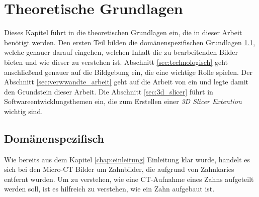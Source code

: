 \chapter{Theoretische Grundlagen}
\label{chap:theoretische_grundlagen} Dieses Kapitel führt in die theoretischen Grundlagen
ein, die in dieser Arbeit benötigt werden. Den ersten Teil bilden die domänenspezifischen
Grundlagen \ref{sec:domänenspezifisch}, welche genauer darauf eingehen, welchen Inhalt
die zu bearbeitenden Bilder bieten und wie dieser zu verstehen ist. Abschnitt
\ref{sec:technologisch} geht anschließend genauer auf die Bildgebung ein, die eine
wichtige Rolle spielen. Der Abschnitt \ref{sec:verwwandte_arbeit} geht auf die
Arbeit von \citet{hoffmann2020} ein und legte damit den Grundstein dieser Arbeit.
Die Abschnitt \ref{sec:3d_slicer} führt in Softwareentwicklungsthemen ein, die zum
Erstellen einer \textit{3D Slicer Extention} wichtig sind.

\section{Domänenspezifisch}
\label{sec:domänenspezifisch} Wie bereits aus dem Kapitel \ref{chap:einleitung}
Einleitung klar wurde, handelt es sich bei den Micro-CT Bilder um Zahnbilder,
die aufgrund von Zahnkaries entfernt wurden. Um zu verstehen, wie eine CT-Aufnahme
eines Zahns aufgeteilt werden soll, ist es hilfreich zu verstehen, wie ein Zahn
aufgebaut ist.

